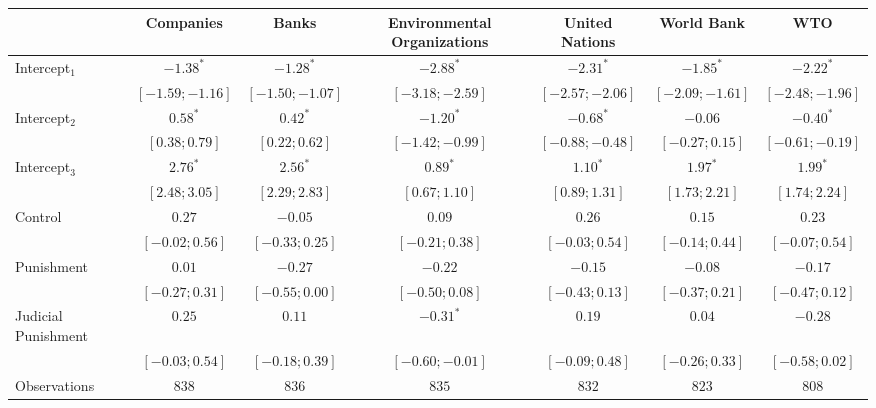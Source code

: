 \begin{table}
\begin{center}
\begin{threeparttable}
\begin{tabular}{l c c c c c c}
\hline
 & Companies & Banks & Environmental Organizations & United Nations & World Bank & WTO \\
\hline
Intercept$_1$       & $-1.38^{*}$       & $-1.28^{*}$       & $-2.88^{*}$       & $-2.31^{*}$       & $-1.85^{*}$       & $-2.22^{*}$       \\
                    & $ [-1.59; -1.16]$ & $ [-1.50; -1.07]$ & $ [-3.18; -2.59]$ & $ [-2.57; -2.06]$ & $ [-2.09; -1.61]$ & $ [-2.48; -1.96]$ \\
Intercept$_2$       & $0.58^{*}$        & $0.42^{*}$        & $-1.20^{*}$       & $-0.68^{*}$       & $-0.06$           & $-0.40^{*}$       \\
                    & $ [ 0.38;  0.79]$ & $ [ 0.22;  0.62]$ & $ [-1.42; -0.99]$ & $ [-0.88; -0.48]$ & $ [-0.27;  0.15]$ & $ [-0.61; -0.19]$ \\
Intercept$_3$       & $2.76^{*}$        & $2.56^{*}$        & $0.89^{*}$        & $1.10^{*}$        & $1.97^{*}$        & $1.99^{*}$        \\
                    & $ [ 2.48;  3.05]$ & $ [ 2.29;  2.83]$ & $ [ 0.67;  1.10]$ & $ [ 0.89;  1.31]$ & $ [ 1.73;  2.21]$ & $ [ 1.74;  2.24]$ \\
Control             & $0.27$            & $-0.05$           & $0.09$            & $0.26$            & $0.15$            & $0.23$            \\
                    & $ [-0.02;  0.56]$ & $ [-0.33;  0.25]$ & $ [-0.21;  0.38]$ & $ [-0.03;  0.54]$ & $ [-0.14;  0.44]$ & $ [-0.07;  0.54]$ \\
Punishment          & $0.01$            & $-0.27$           & $-0.22$           & $-0.15$           & $-0.08$           & $-0.17$           \\
                    & $ [-0.27;  0.31]$ & $ [-0.55;  0.00]$ & $ [-0.50;  0.08]$ & $ [-0.43;  0.13]$ & $ [-0.37;  0.21]$ & $ [-0.47;  0.12]$ \\
Judicial Punishment & $0.25$            & $0.11$            & $-0.31^{*}$       & $0.19$            & $0.04$            & $-0.28$           \\
                    & $ [-0.03;  0.54]$ & $ [-0.18;  0.39]$ & $ [-0.60; -0.01]$ & $ [-0.09;  0.48]$ & $ [-0.26;  0.33]$ & $ [-0.58;  0.02]$ \\
\hline
Observations        & $838$             & $836$             & $835$             & $832$             & $823$             & $808$             \\

\end{tabular}
\end{threeparttable}
\end{center}
\end{table}
